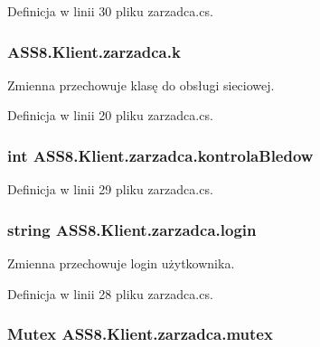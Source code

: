 Definicja w linii 30 pliku zarzadca.cs.\hypertarget{a00037_b7fef33c2cf29406276fbbb926338c96}{
\subsubsection[{k}]{ {\bf ASS8.Klient.zarzadca.k}}}
\label{d1/dc6/a00037_b7fef33c2cf29406276fbbb926338c96}


Zmienna przechowuje klasę do obsługi sieciowej. 



Definicja w linii 20 pliku zarzadca.cs.\hypertarget{a00037_3d392ffd05da1da4971c8f2629be04eb}{
\subsubsection[{kontrolaBledow}]{\setlength{\rightskip}{0pt plus 5cm}int {\bf ASS8.Klient.zarzadca.kontrolaBledow}}}
\label{d1/dc6/a00037_3d392ffd05da1da4971c8f2629be04eb}




Definicja w linii 29 pliku zarzadca.cs.\hypertarget{a00037_064dde1d0807e0df79bbf7b697878583}{
\subsubsection[{login}]{\setlength{\rightskip}{0pt plus 5cm}string {\bf ASS8.Klient.zarzadca.login}}}
\label{d1/dc6/a00037_064dde1d0807e0df79bbf7b697878583}


Zmienna przechowuje login użytkownika. 



Definicja w linii 28 pliku zarzadca.cs.\hypertarget{a00037_92cb338fa86bdf0e8f952202ffa362ca}{
\subsubsection[{mutex}]{\setlength{\rightskip}{0pt plus 5cm}Mutex {\bf ASS8.Klient.zarzadca.mutex}}}
\label{d1/dc6/a00037_92cb338fa86bdf0e8f952202ffa362ca}




